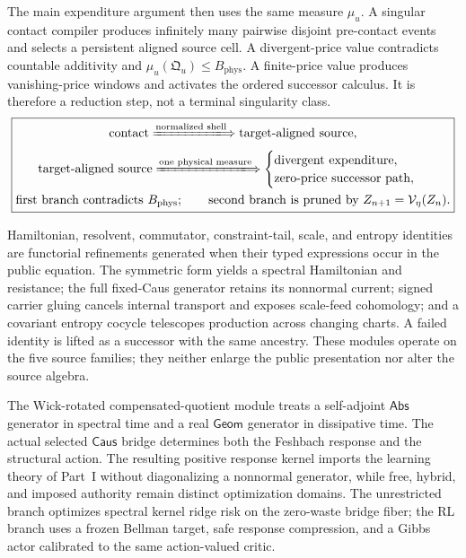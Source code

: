 \documentclass[11pt]{article}
\numberwithin{section}{part}
\theoremstyle{plain}
\theoremstyle{definition}
\theoremstyle{remark}
\newcommand{\Geom}{\mathsf{Geom}}
\newcommand{\Caus}{\mathsf{Caus}}
\newcommand{\Abs}{\mathsf{Abs}}
\newcommand{\Phys}{\mathrm{phys}}
\newcommand{\Budget}{B_{\Phys}}
\begin{document}
The main expenditure argument then uses the same measure \(\mu_u\).  A
singular contact compiler produces infinitely many pairwise disjoint
pre-contact events and selects a persistent aligned source cell.  A
divergent-price value contradicts countable additivity and
\(\mu_u(\mathfrak Q_u)\le\Budget\).  A finite-price value produces
vanishing-price windows and activates the ordered successor calculus.  It is
therefore a reduction step, not a terminal singularity class.
\[
 \boxed{
 \begin{gathered}
 \text{contact}
 \xLongrightarrow{\text{normalized shell}}
 \text{target-aligned source},\\
 \text{target-aligned source}
 \xLongrightarrow{\text{one physical measure}}
 \begin{cases}
  \text{divergent expenditure},\\
  \text{zero-price successor path},
 \end{cases}\\
 \text{first branch contradicts }\Budget;\qquad
 \text{second branch is pruned by }Z_{n+1}=\mathcal V_\eta(Z_n).
 \end{gathered}}
\]

Hamiltonian, resolvent, commutator, constraint-tail, scale, and entropy
identities are functorial refinements generated when their typed expressions
occur in the public equation.  The symmetric form yields a spectral
Hamiltonian and resistance; the full fixed-Caus generator retains its
nonnormal current; signed carrier gluing cancels internal transport and
exposes scale-feed cohomology; and a covariant entropy cocycle telescopes
production across changing charts.  A failed identity is lifted as a
successor with the same ancestry.  These modules operate on the five source
families; they neither enlarge the public presentation nor alter the source algebra.

The Wick-rotated compensated-quotient module treats a self-adjoint
\(\Abs\) generator in spectral time and a real \(\Geom\) generator in
dissipative time.  The actual selected \(\Caus\) bridge determines both the
Feshbach response and the structural action.  The resulting positive response
kernel imports the learning theory of Part~I without diagonalizing a
nonnormal generator, while free, hybrid, and imposed authority remain
distinct optimization domains.  The unrestricted branch optimizes spectral
kernel ridge risk on the zero-waste bridge fiber; the RL branch uses a frozen
Bellman target, safe response compression, and a Gibbs actor calibrated to
the same action-valued critic.
\end{document}
